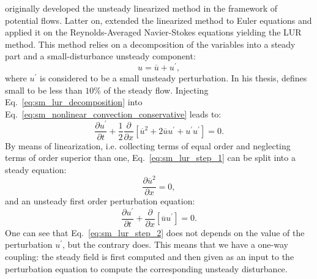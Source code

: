 
\citet{Verdon1984} originally developed the unsteady linearized 
method in the framework of potential flows. Latter on, \citet{Hall1989}
extended the linearized method to Euler equations and
\citet{Clark2000} applied it on the Reynolds-Averaged Navier-Stokes equations
yielding the LUR method.
This method relies on a decomposition of the variables
into a steady part and a small-disturbance unsteady component:
\begin{equation}
	u = \overline{u} + u^\prime,
	\label{eq:sm_lur_decomposition}
\end{equation}
where $u^\prime$ is considered to be a small unsteady perturbation. 
In his thesis,
\citet{Hall1987} defines small to be less than $10\%$ of the
steady flow.
Injecting Eq.~\ref{eq:sm_lur_decomposition} into 
Eq.~\ref{eq:sm_nonlinear_convection_conservative} leads to:
\begin{equation}
	\frac{\partial u^\prime}{\partial t} + 
	\frac{1}{2}\frac{\partial}{\partial x} \left[
	\overline{u}^2 + 2 \overline{u} u^\prime + u^\prime u^\prime \right] = 
	0.
	\label{eq:sm_lur_step_1}
\end{equation}
By means of linearization, i.e. collecting terms
of equal order and neglecting terms of order superior than one, 
Eq.~\ref{eq:sm_lur_step_1} can be split
into a steady equation:
\begin{equation}
	\frac{\partial \overline{u}^2}{\partial x} = 0,
	\label{eq:sm_lur_step_2}
\end{equation}
and an unsteady first order perturbation equation:
\begin{equation}
	\frac{\partial u^\prime}{\partial t} +
	\frac{\partial}{\partial x} \left[
	\overline{u} u^\prime \right] = 
	0.
	\label{eq:sm_lur_step_3}
\end{equation}
One can see that Eq.~\ref{eq:sm_lur_step_2} does not depends
on the value of the perturbation $u^\prime$, but the 
contrary does.
This means that we have a one-way coupling: the steady field
is first computed and then given as an input to the
perturbation equation to compute
the corresponding unsteady disturbance.

